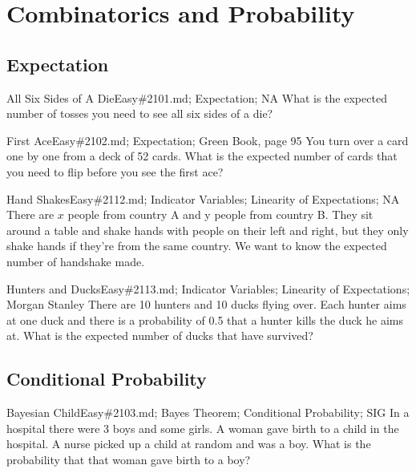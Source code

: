 \documentclass[oldfontcommands]{memoir}
\begin{document}
{\chapter{Combinatorics and Probability}
\minitoc
\section{Expectation}
\begin{question}{All Six Sides of A Die}{Easy}{\#2101.md; Expectation; NA}
What is the expected number of tosses you need to see all six sides of a die?

\end{question}

\begin{question}{First Ace}{Easy}{\#2102.md; Expectation; Green Book, page 95}
You turn over a card one by one from a deck of 52 cards. What is the expected number of cards that you need to flip before you see the first ace?

\end{question}

\begin{question}{Hand Shakes}{Easy}{\#2112.md; Indicator Variables; Linearity of Expectations; NA}
There are $x$ people from country A and y people from country B. They sit around a table and shake hands with people on their left and right, but they only shake hands if they're from the same country. We want to know the expected number of handshake made.

\end{question}

\begin{question}{Hunters and Ducks}{Easy}{\#2113.md; Indicator Variables; Linearity of Expectations; Morgan Stanley}
There are 10 hunters and 10 ducks flying over. Each hunter aims at one duck and there is a probability of 0.5 that a hunter kills the duck he aims at. What is the expected number of ducks that have survived?

\end{question}

\section{Conditional Probability}
\begin{question}{Bayesian Child}{Easy}{\#2103.md; Bayes Theorem; Conditional Probability; SIG}
In a hospital there were 3 boys and some girls. A woman gave birth to a child in the hospital. A nurse picked up a child at random and was a boy. What is the probability that that woman gave birth to a boy?


\end{question}}
\end{document}
